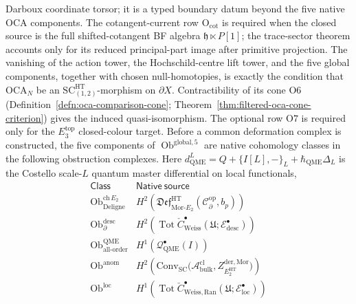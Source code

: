 \begin{thm}
Darboux coordinate torsor; it is a typed boundary datum beyond the five
native OCA components.  The
cotangent-current row \(\mathrm{O}_{\mathrm{cot}}\) is required when the
closed source is the full shifted-cotangent BF algebra
\(\mathfrak h\ltimes P[1]\); the trace-sector theorem accounts only for
its reduced principal-part image after primitive projection.
The vanishing of the action tower, the Hochschild-centre lift tower,
and the five global components, together with chosen null-homotopies, is
exactly the condition that
\(\mathrm{OCA}_N\) be an
\(\mathrm{SC}^{\mathrm{HT}}_{(1,2)}\)-morphism on \(\partial X\).
Contractibility of its cone \(\mathrm{O6}\)
(Definition~\ref{defn:oca-comparison-cone};
Theorem~\ref{thm:filtered-oca-cone-criterion}) gives the induced
quasi-isomorphism.  The optional row \(\mathrm{O7}\) is required only
for the \(E_3^{\mathrm{top}}\) closed-colour target.
Before a common deformation complex is constructed, the five components
of \(\operatorname{Ob}^{\mathrm{global},5}\) are native cohomology
classes in the following obstruction complexes.
Here \(d_{\mathrm{QME}}^{L}=Q+\{I[L],-\}_{L}+\hbar_{\mathrm{QME}}\Delta_L\) is the
Costello scale-\(L\) quantum master differential on local functionals,
\begin{equation}\label{eq:five-component-complexes}
\begin{array}{l|l}
  \mathsf{Class} & \mathsf{Native\ source}\\\hline
	  \operatorname{Ob}^{\mathrm{ch}\,E_2}_{\mathrm{Deligne}}
	    & H^2\!\left(
	        \mathfrak{Def}^{\mathrm{HT}}_{\mathrm{Mor}\mbox{-}E_2}
	        (\mathcal C^{\mathrm{op}}_\partial,b_p)\right)\\
	  \operatorname{Ob}^{\mathrm{desc}}_{\partial}
	    & H^2\!\left(
	      \operatorname{Tot}\check C^\bullet_{\mathrm{Weiss}}
	      (\mathfrak U;\mathcal E^\bullet_{\mathrm{desc}})\right)\\
  \operatorname{Ob}^{\mathrm{QME}}_{\mathrm{all\mbox{-}order}}
    & H^1(\mathcal Q^\bullet_{\mathrm{QME}}(I))\\
  \operatorname{Ob}^{\mathrm{anom}}
    & H^2(\mathrm{Conv}_{\mathrm{SC}}\!\bigl(\mathcal A^{\mathrm{cl}}_{\mathrm{bulk}},
       Z^{\mathrm{der},\mathrm{Mor}}_{E_2^{\mathrm{HT}}}\bigr))\\
	  \operatorname{Ob}^{\mathrm{loc}}
	    & H^1\!\left(
	      \operatorname{Tot}\check C^\bullet_{\mathrm{Weiss,Ran}}
	      (\mathfrak U;\mathcal E^\bullet_{\mathrm{loc}})\right)
\end{array}
\end{equation}

\end{thm}

